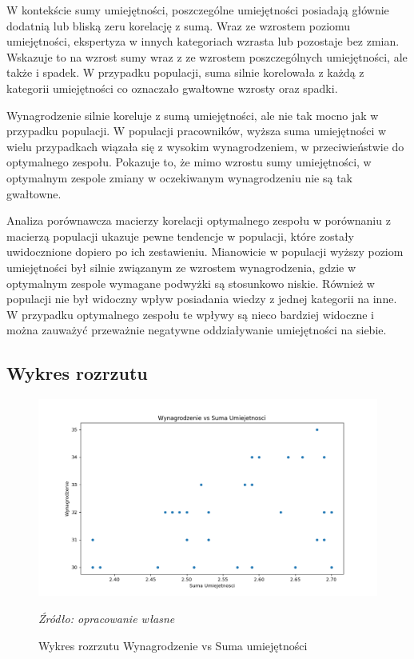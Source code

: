     \par W kontekście sumy umiejętności, poszczególne umiejętności posiadają głównie dodatnią lub bliską zeru korelację z sumą. Wraz ze wzrostem poziomu umiejętności, ekspertyza w innych kategoriach wzrasta lub pozostaje bez zmian. Wskazuje to na wzrost sumy wraz z ze wzrostem poszczególnych umiejętności, ale także i spadek. W przypadku populacji, suma silnie korelowała z każdą z kategorii umiejętności co oznaczało gwałtowne wzrosty oraz spadki.

    \par Wynagrodzenie silnie koreluje z sumą umiejętności, ale nie tak mocno jak w przypadku populacji. W populacji pracowników, wyższa suma umiejętności w wielu przypadkach wiązała się z wysokim wynagrodzeniem, w przeciwieństwie do optymalnego zespołu. Pokazuje to, że mimo wzrostu sumy umiejętności, w optymalnym zespole zmiany w oczekiwanym wynagrodzeniu nie są tak gwałtowne.

    \par Analiza porównawcza macierzy korelacji optymalnego zespołu w porównaniu z macierzą populacji ukazuje pewne tendencje w populacji, które zostały uwidocznione dopiero po ich zestawieniu. Mianowicie w populacji wyższy poziom umiejętności był silnie związanym ze wzrostem wynagrodzenia, gdzie w optymalnym zespole wymagane podwyżki są stosunkowo niskie. Również w populacji nie był widoczny wpływ posiadania wiedzy z jednej kategorii na inne. W przypadku optymalnego zespołu te wpływy są nieco bardziej widoczne i można zauważyć przeważnie negatywne oddziaływanie umiejętności na siebie.
    
    \subsection{Wykres rozrzutu}
    \begin{figure}[H]
        \centering
        \includegraphics[width=\linewidth]{chapters/Images/rozrzut_optimal.png}
        \cprotect\caption{Wykres rozrzutu Wynagrodzenie vs Suma umiejętności}
        \textit{Źródło: opracowanie własne} 
        \label{fig:scatter_plot_optimal}
    \end{figure}

